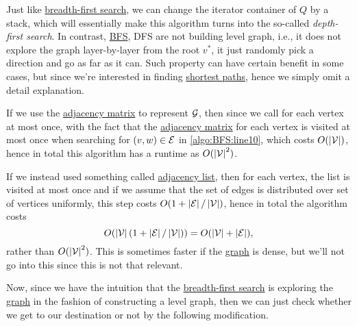 \begin{remark}\label{rmk:DFS}
	Just like \hyperref[algo:BFS]{breadth-first search}, we can change the iterator container of \(Q\) by a stack, which will essentially make this algorithm turns into the so-called \emph{depth-first search}. In contrast, \hyperref[algo:BFS]{BFS}, DFS are not building level graph, i.e., it does not explore the graph layer-by-layer from the root \(v^{\ast} \), it just randomly pick a direction and go as far as it can. Such property can have certain benefit in some cases, but since we're interested in finding \hyperref[def:shortest-path]{shortest paths}, hence we simply omit a detail explanation.
\end{remark}

If we use the \hyperref[def:adjacency-matrix]{adjacency matrix} to represent \(\mathcal{\MakeUppercase{g}} \), then since we call for each vertex at most once, with the fact that the \hyperref[def:adjacency-matrix]{adjacency matrix} for each vertex is visited at most once when searching for \((v, w)\in \mathcal{\MakeUppercase{e}} \) in \autoref{algo:BFS:line10}, which costs \(O(\left\vert \mathcal{\MakeUppercase{v}}  \right\vert )\), hence in total this algorithm has a runtime as \(O(\left\vert \mathcal{\MakeUppercase{v}}  \right\vert^{2} )\).

\begin{remark}
	If we instead used something called \href{https://en.wikipedia.org/wiki/Adjacency_list#:~:text=In%20graph%20theory%20and%20computer,particular%20vertex%20in%20the%20graph.}{adjacency list}, then for each vertex, the list is visited at most once and if we assume that the set of edges is distributed over set of vertices uniformly, this step costs \(O(1 + \left\vert \mathcal{\MakeUppercase{e}}  \right\vert / \left\vert \mathcal{\MakeUppercase{v}}  \right\vert )\), hence in total the algorithm costs
	\[
		O(\left\vert \mathcal{\MakeUppercase{v}}  \right\vert (1 + \left\vert \mathcal{\MakeUppercase{e}}  \right\vert / \left\vert \mathcal{\MakeUppercase{v}}  \right\vert ))= O(\left\vert \mathcal{\MakeUppercase{v}}  \right\vert + \left\vert \mathcal{\MakeUppercase{e}}  \right\vert ),
	\]
	rather than \(O(\left\vert \mathcal{\MakeUppercase{v}}  \right\vert ^{2} )\). This is sometimes faster if the \hyperref[def:graph]{graph} is dense, but we'll not go into this since this is not that relevant.
\end{remark}

Now, since we have the intuition that the \hyperref[algo:BFS]{breadth-first search} is exploring the \hyperref[def:graph]{graph} in the fashion of constructing a level graph, then we can just check whether we get to our destination or not by the following modification.

